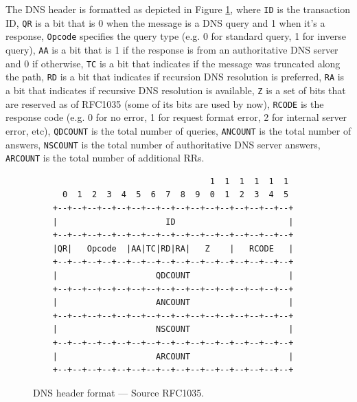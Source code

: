 \documentclass[pdftex,12pt,a4paper]{article}
\begin{document}
            The DNS header is formatted as depicted in Figure \ref{fig:hdr},
            where \texttt{ID} is the transaction ID, \texttt{QR} is a bit that
            is 0 when the message is a DNS query and 1 when it's a response,
            \texttt{Opcode} specifies the query type (e.g. 0 for standard
            query, 1 for inverse query), \texttt{AA} is a bit that is 1 if the
            response is from an authoritative DNS server and 0 if otherwise,
            \texttt{TC} is a bit that indicates if the message was truncated
            along the path, \texttt{RD} is a bit that indicates if recursion
            DNS resolution is preferred, \texttt{RA} is a bit that indicates if
            recursive DNS resolution is available, \texttt{Z} is a set of bits
            that are reserved as of RFC1035 (some of its bits are used by now),
            \texttt{RCODE} is the response code (e.g. 0 for no error, 1 for
            request format error, 2 for internal server error, etc),
            \texttt{QDCOUNT} is the total number of queries, \texttt{ANCOUNT}
            is the total number of answers, \texttt{NSCOUNT} is the total
            number of authoritative DNS server answers, \texttt{ARCOUNT} is the
            total number of additional RRs.
            \begin{figure}[!htb]
                \centering
            \begin{verbatim}                                    1  1  1  1  1  1
      0  1  2  3  4  5  6  7  8  9  0  1  2  3  4  5
    +--+--+--+--+--+--+--+--+--+--+--+--+--+--+--+--+
    |                      ID                       |
    +--+--+--+--+--+--+--+--+--+--+--+--+--+--+--+--+
    |QR|   Opcode  |AA|TC|RD|RA|   Z    |   RCODE   |
    +--+--+--+--+--+--+--+--+--+--+--+--+--+--+--+--+
    |                    QDCOUNT                    |
    +--+--+--+--+--+--+--+--+--+--+--+--+--+--+--+--+
    |                    ANCOUNT                    |
    +--+--+--+--+--+--+--+--+--+--+--+--+--+--+--+--+
    |                    NSCOUNT                    |
    +--+--+--+--+--+--+--+--+--+--+--+--+--+--+--+--+
    |                    ARCOUNT                    |
    +--+--+--+--+--+--+--+--+--+--+--+--+--+--+--+--+\end{verbatim}
                \caption{DNS header format --- Source RFC1035.}
                \label{fig:hdr}
            \end{figure}
\end{document}
